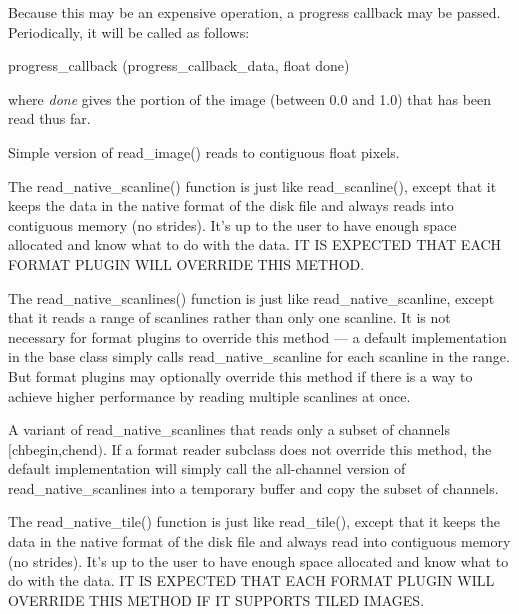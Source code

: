 Because this may be an expensive operation, a progress callback may be passed.
Periodically, it will be called as follows:\\
\begin{code}
    progress_callback (progress_callback_data, float done)
\end{code}
\noindent where \emph{done} gives the portion of the image 
(between 0.0 and 1.0) that has been read thus far.
\apiend

Simple version of {\kw read_image()} reads to contiguous float pixels.
\apiend

The {\kw read_native_scanline()} function is just like {\kw
  read_scanline()}, except that it keeps the data in the native format
of the disk file and always reads into contiguous memory (no strides).
It's up to the user to have enough space allocated and know what to do
with the data.  IT IS EXPECTED THAT EACH FORMAT PLUGIN WILL OVERRIDE
THIS METHOD.
\apiend

The {\kw read_native_scanlines()} function is just like 
{\cf read_native_scanline}, except that it reads
a range of scanlines rather than only one scanline.  It is not necessary
for format plugins to override this method --- a default implementation
in the \ImageInput base class simply calls {\cf read_native_scanline}
for each scanline in the range.  But format plugins may optionally
override this method if there is a way to achieve higher performance by
reading multiple scanlines at once.
\apiend

A variant of {\cf read_native_scanlines} that reads only a subset of 
channels \\ $[${\cf chbegin},{\cf chend}$)$.  
If a format reader subclass does
not override this method, the default implementation will simply
call the all-channel version of {\cf read_native_scanlines} into a
temporary buffer and copy the subset of channels.
\apiend

The {\kw read_native_tile()} function is just like {\kw read_tile()}, 
except that it keeps the data in the native format of the disk file and
always read into contiguous memory (no strides).  It's up to the user to
have enough space allocated and know what to do with the data.  IT IS
EXPECTED THAT EACH FORMAT PLUGIN WILL OVERRIDE THIS METHOD IF IT
SUPPORTS TILED IMAGES.
\apiend

